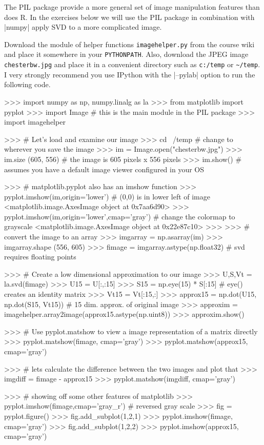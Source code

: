 \begin{R}
The PIL package provide a more general set of image manipulation features than does R.  In the exercises below we will use the PIL package in combination with |numpy| apply SVD to a more complicated image.

Download the module of helper functions \verb|imagehelper.py| from the course wiki and place it somewhere in your \verb|PYTHONPATH|. Also, download the JPEG image \verb|chesterbw.jpg| and place it in a convenient directory such as \verb|c:/temp| or \verb|~/temp|. {\color{DarkRed} I very strongly recommend you use IPython with the |--pylab| option to run the following code.}

\begin{python}
>>> import numpy as np, numpy.linalg as la
>>> from matplotlib import pyplot
>>> import Image # this is the main module in the PIL package
>>> import imagehelper

>>>  # Let's load and examine our image
>>> cd ~/temp # change to wherever you save the image
>>> im = Image.open("chesterbw.jpg")
>>> im.size
(605, 556) # the image is 605 pixels x 556 pixels
>>> im.show() # assumes you have a default image viewer configured in your OS
 
>>> # matplotlib.pyplot also has an imshow function
>>> pyplot.imshow(im,origin='lower') # (0,0) is in lower left of image
<matplotlib.image.AxesImage object at 0x7aa6d90>
>>> pyplot.imshow(im,origin='lower',cmap='gray') # change the colormap to grayscale
<matplotlib.image.AxesImage object at 0x22e87c10>
>>>
>>>   # convert the image to an array
>>> imgarray = np.asarray(im)
>>> imgarray.shape
(556, 605)
>>> fimage = imgarray.astype(np.float32) # svd requires floating points

>>>   # Create a low dimensional approximation to our image
>>> U,S,Vt = la.svd(fimage)
>>> U15 = U[:,:15]
>>> S15 = np.eye(15) * S[:15] # eye() creates an identity matrix
>>> Vt15 = Vt[:15,:]
>>> approx15 = np.dot(U15, np.dot(S15, Vt15)) # 15 dim. approx. of original image
>>> approxim = imagehelper.array2image(approx15.astype(np.uint8))
>>> approxim.show()

>>>    # Use pyplot.matshow to view a image representation of a matrix directly
>>> pyplot.matshow(fimage, cmap='gray')
>>> pyplot.matshow(approx15, cmap='gray')

>>>    # lets calculate the difference between the two images and plot that
>>> imgdiff = fimage - approx15
>>> pyplot.matshow(imgdiff, cmap='gray')

>>>    # showing off some other features of matplotlib
>>> pyplot.imshow(fimage,cmap='gray_r') # reversed gray scale
>>> fig = pyplot.figure()
>>> fig.add_subplot(1,2,1)
>>> pyplot.imshow(fimage, cmap='gray')
>>> fig.add_subplot(1,2,2)
>>> pyplot.imshow(approx15, cmap='gray')


\end{python}
\end{R}

